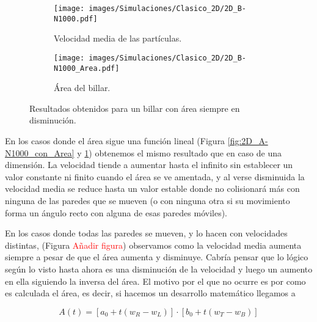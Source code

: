 \documentclass[11pt, spanish]{book}
\begin{document}
\begin{figure}[H]
    \begin{subfigure}[b]{0.5\textwidth}
        \centering
        \texttt{[image: images/Simulaciones/Clasico\_2D/2D\_B-N1000.pdf]}
        \caption{Velocidad media de las partículas.}
    \end{subfigure}
    \hfill
    \begin{subfigure}[b]{0.5\textwidth}
        \centering
        \texttt{[image: images/Simulaciones/Clasico\_2D/2D\_B-N1000\_Area.pdf]}
        \caption{Área del billar.}
    \end{subfigure}
    \caption{Resultados obtenidos para un billar con área siempre en disminución.}
    \label{fig:2D_B-N1000_con_Area}
\end{figure}

En los casos donde el área sigue una función lineal (Figura \ref{fig:2D_A-N1000_con_Area} y \ref{fig:2D_B-N1000_con_Area}) obtenemos el mismo resultado que en caso de una dimensión. La velocidad tiende a aumentar hasta el infinito sin establecer un valor constante ni finito cuando el área se ve amentada, y al verse disminuida la velocidad media se reduce hasta un valor estable donde no colisionará más con ninguna de las paredes que se mueven (o con ninguna otra si su movimiento forma un ángulo recto con alguna de esas paredes móviles).

\vspace{3mm}

En los casos donde todas las paredes se mueven, y lo hacen con velocidades distintas, (Figura \textcolor{red}{Añadir figura}) observamos como la velocidad media aumenta siempre a pesar de que el área aumenta y disminuye. Cabría pensar que lo lógico según lo visto hasta ahora es una disminución de la velocidad y luego un aumento en ella siguiendo la inversa del área. El motivo por el que no ocurre es por como es calculada el área, es decir, si hacemos un desarrollo matemático llegamos a 

\begin{equation}
    A(t) = \left[ a_0 + t (w_R - w_L) \right] \cdot \left[ b_0 + t (w_T - w_B) \right]
\end{equation}
\end{document}
